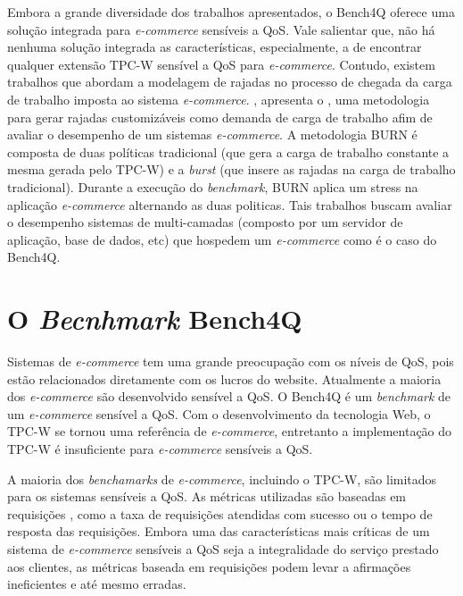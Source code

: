 Embora a grande diversidade dos trabalhos apresentados, o Bench4Q oferece uma solução integrada para \textit{e-commerce} sensíveis a QoS. Vale salientar que, não há nenhuma solução integrada as características, especialmente, a de encontrar qualquer extensão TPC-W sensível a QoS para \textit{e-commerce}. Contudo, existem trabalhos que abordam a modelagem de rajadas no processo de chegada da carga de trabalho imposta ao sistema \textit{e-commerce}. \cite{Casale2012}, apresenta o , uma metodologia para gerar rajadas customizáveis como demanda de carga de trabalho afim de avaliar o desempenho de um sistemas \textit{e-commerce}. A metodologia BURN é composta de duas políticas tradicional (que gera a carga de trabalho constante a mesma gerada pelo TPC-W) e a \textit{burst} (que insere as rajadas na carga de trabalho tradicional). Durante a execução do \textit{benchmark}, BURN aplica um stress na aplicação \textit{e-commerce} alternando as duas politicas. Tais trabalhos buscam avaliar o desempenho sistemas de multi-camadas (composto por um servidor de aplicação, base de dados, etc) que hospedem um \textit{e-commerce} como é o caso do Bench4Q.

\section{O \textit{Becnhmark} Bench4Q}

Sistemas de \textit{e-commerce} tem uma grande preocupação com os níveis de QoS, pois estão relacionados diretamente com os lucros do website. Atualmente a maioria dos \textit{e-commerce} são desenvolvido sensível a QoS. O Bench4Q é um \textit{benchmark} de um \textit{e-commerce} sensível a QoS.  Com o desenvolvimento da tecnologia Web, o TPC-W se tornou uma referência de \textit{e-commerce}, entretanto a implementação do TPC-W é insuficiente para \textit{e-commerce} sensíveis a QoS.

A maioria dos \textit{benchamarks} de \textit{e-commerce}, incluindo o TPC-W, são limitados para os sistemas sensíveis a QoS. As métricas utilizadas são baseadas em requisições , como a taxa de requisições atendidas com sucesso ou o tempo de resposta das requisições. Embora uma das características mais críticas de um sistema de \textit{e-commerce} sensíveis a QoS seja a integralidade do serviço prestado aos clientes, as métricas baseada em requisições podem levar a afirmações ineficientes e até mesmo erradas.

